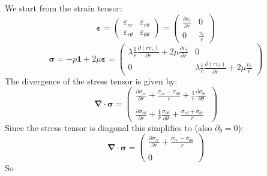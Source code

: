 We start from the strain tensor:
\[
{\bm \varepsilon} =
\left(
\begin{array}{cc}
\varepsilon_{rr} & \varepsilon_{r\theta} \\ 
\varepsilon_{r\theta} & \varepsilon_{\theta\theta} 
\end{array}
\right)
=
\left(
\begin{array}{cc}
\frac{\partial v_r}{\partial r} & 0 \\
0 &  \frac{v_r}{r} 
\end{array}
\right)
\]
\[
{\bm \sigma} 
= - p {\bm 1} + 2\mu {\bm \varepsilon}
=  
\left(
\begin{array}{cc}
\lambda \frac{1}{r} \frac{\partial (r v_r)}{\partial r} + 2\mu\frac{\partial v_r}{\partial r} & 0 \\
0 & \lambda \frac{1}{r} \frac{\partial (r v_r)}{\partial r}  +  2 \mu\frac{v_r}{r} 
\end{array}
\right)
\]
The divergence of the stress tensor is given by:
\[
{\bm \nabla}\cdot {\bm \sigma} 
=
\left(
\begin{array}{c}
\frac{\partial \sigma_{rr}}{\partial r} + \frac{\sigma_{rr}-\sigma_{\theta\theta}}{r} + \frac{1}{r} \frac{\partial \sigma_{\theta r}}{\partial \theta} \\ \\
\frac{\partial \sigma_{r \theta}}{\partial r} + \frac{1}{r} \frac{\sigma_{\theta\theta}}{\partial \theta}
+\frac{\sigma_{r\theta} + \sigma_{\theta r}}{r}
\end{array}
\right)
\]
Since the stress tensor is diagonal this simplifies to (also $\partial_\theta =0$):
\[
{\bm \nabla}\cdot {\bm \sigma} 
=
\left(
\begin{array}{c}
\frac{\partial \sigma_{rr}}{\partial r} + \frac{\sigma_{rr}-\sigma_{\theta\theta}}{r} \\ \\
0
\end{array}
\right)
\]
So
